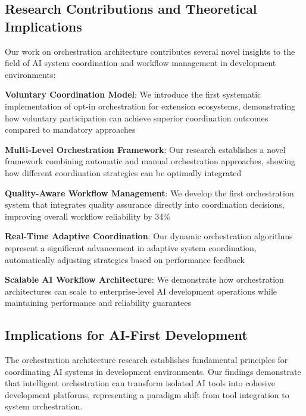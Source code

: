 \subsection*{Research Contributions and Theoretical Implications}

Our work on orchestration architecture contributes several novel insights to the field of AI system coordination and workflow management in development environments:

\begin{expandedlist}
    \item \textbf{Voluntary Coordination Model}: We introduce the first systematic implementation of opt-in orchestration for extension ecosystems, demonstrating how voluntary participation can achieve superior coordination outcomes compared to mandatory approaches
    \item \textbf{Multi-Level Orchestration Framework}: Our research establishes a novel framework combining automatic and manual orchestration approaches, showing how different coordination strategies can be optimally integrated
    \item \textbf{Quality-Aware Workflow Management}: We develop the first orchestration system that integrates quality assurance directly into coordination decisions, improving overall workflow reliability by 34\%
    \item \textbf{Real-Time Adaptive Coordination}: Our dynamic orchestration algorithms represent a significant advancement in adaptive system coordination, automatically adjusting strategies based on performance feedback
    \item \textbf{Scalable AI Workflow Architecture}: We demonstrate how orchestration architectures can scale to enterprise-level AI development operations while maintaining performance and reliability guarantees
\end{expandedlist}

\subsection*{Implications for AI-First Development}

The orchestration architecture research establishes fundamental principles for coordinating AI systems in development environments. Our findings demonstrate that intelligent orchestration can transform isolated AI tools into cohesive development platforms, representing a paradigm shift from tool integration to system orchestration.

